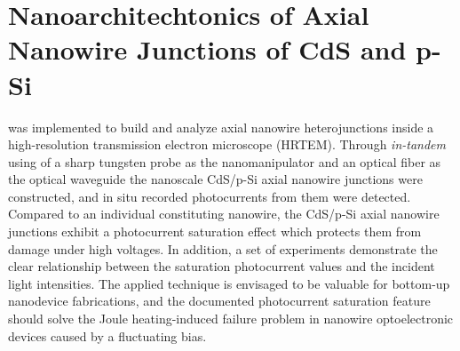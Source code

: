 

\chapter{Nanoarchitechtonics of Axial Nanowire Junctions of CdS and p-Si}

 was implemented to build and analyze axial nanowire heterojunctions inside a high-resolution transmission electron microscope (HRTEM). Through {\em in-tandem} using of a sharp tungsten probe as the nanomanipulator and an optical fiber as the optical waveguide the nanoscale CdS/p-Si axial nanowire junctions were constructed, and in situ recorded photocurrents from them were detected. Compared to an individual constituting nanowire, the CdS/p-Si axial nanowire junctions exhibit a photocurrent saturation effect which protects them from damage under high voltages. In addition, a set of experiments demonstrate the clear relationship between the saturation photocurrent values and the incident light intensities. The applied technique is envisaged to be valuable for bottom-up nanodevice fabrications, and the documented photocurrent saturation feature should solve the Joule heating-induced failure problem in nanowire optoelectronic devices caused by a fluctuating bias. 

